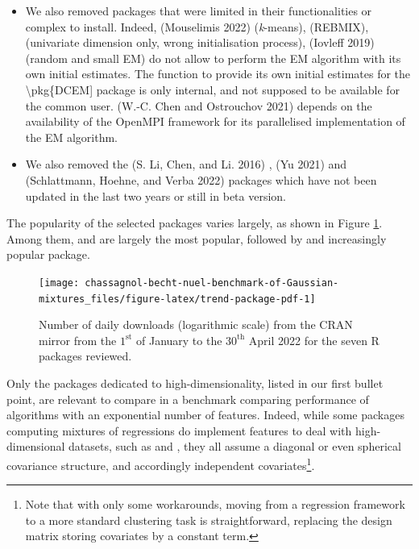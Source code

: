\begin{itemize}
\item
  We also removed packages that were limited in their functionalities
  or complex to install. Indeed,  (Mouselimis 2022)
  (\emph{k}-means),  (REBMIX),  (univariate
  dimension only, wrong initialisation process), 
  (Iovleff 2019) (random and small EM) do not allow to perform the EM
  algorithm with its own initial estimates. The function to provide its own initial estimates for the \textbackslash pkg\{DCEM{]} package is only internal, and not supposed to be available for the common user.  (W.-C. Chen and Ostrouchov 2021) depends on
  the availability of the OpenMPI framework for its parallelised
  implementation of the EM algorithm.
\item
  We also removed the  (S. Li, Chen, and Li. 2016) ,
   (Yu 2021) and  (Schlattmann, Hoehne, and Verba 2022) packages
  which have not been updated in the last two years or still in beta
  version.
\end{itemize}

The popularity of the selected packages varies largely, as shown in
Figure
\ref{fig:trend-package-pdf}.
Among them,  and  are largely the most popular,
followed by  and increasingly popular 
package.

\begin{figure}

{\centering \texttt{[image: chassagnol-becht-nuel-benchmark-of-Gaussian-mixtures\_files/figure-latex/trend-package-pdf-1]} 

}

\caption{Number of daily downloads (logarithmic scale) from the CRAN mirror from the $1^\text{st}$ of January to the $30^{\text{th}}$ April 2022 for the seven R packages reviewed.}\label{fig:trend-package-pdf}
\end{figure}

\color{green}

Only the packages dedicated to high-dimensionality, listed in our first bullet point, are relevant to compare in a benchmark comparing performance of algorithms with an exponential number of features. Indeed, while some packages computing mixtures of regressions do implement features to deal with high-dimensional datasets, such as  and , they all assume a diagonal or even spherical covariance structure, and accordingly independent covariates\footnote{Note that with only some workarounds, moving from a regression framework to a more standard clustering task is straightforward, replacing the design matrix storing covariates by a constant term.}.

